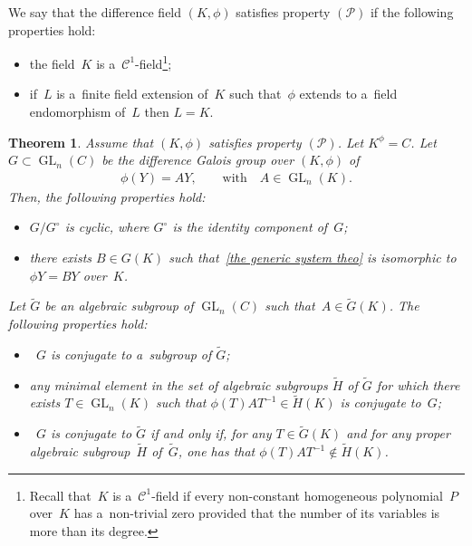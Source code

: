 \documentclass[10pt,a4paper]{amsart}
\numberwithin{equation}{section}
\newtheorem{Theorem}{Theorem}[section]
\begin{document}
\begin{Definition}
\label{prop P}
We say that the dif\/ference f\/ield $(K,\phi)$ satisf\/ies property $(\mathcal{P})$ if the following properties hold:
\begin{itemize}\itemsep=0pt
\item the f\/ield~$K$ is a~$\mathcal{C}^{1}$-f\/ield\footnote{Recall that~$K$ is a~$\mathcal{C}^{1}$-f\/ield if every
non-constant homogeneous polynomial~$P$ over~$K$ has a~non-trivial zero provided that the number of its variables is
more than its degree.};
\item if~$L$ is a~f\/inite f\/ield extension of~$K$ such that~$\phi$ extends to a~f\/ield endomorphism of~$L$ then $L=K$.
\end{itemize}
\end{Definition}

\begin{Theorem}
\label{si prop P alors}
Assume that $(K,\phi)$ satisfies property $(\mathcal{P})$.
Let $K^{\phi} = C$.
Let $G \subset \operatorname{GL}_{n}(C)$ be the difference Galois group over $(K,\phi)$ of
\begin{gather}
\label{the generic system theo}
\phi(Y) = AY, \qquad \text{with} \quad  A \in \operatorname{GL}_{n}(K).
\end{gather}
Then, the following properties hold:
\begin{itemize}
\itemsep=0pt
\item $G/G^{\circ}$ is cyclic, where $G^{\circ}$ is the identity component of~$G$;
\item there exists $B \in G(K)$ such that~\eqref{the generic system theo} is isomorphic to $\phi Y=BY$ over~$K$.
\end{itemize}
Let $\widetilde{G}$ be an algebraic subgroup of $\operatorname{GL}_{n}(C)$ such that~$A\in \widetilde{G}(K)$.
The following properties hold:
\begin{itemize}
\itemsep=0pt
\item~$G$ is conjugate to a~subgroup of $\widetilde{G}$;
\item any minimal element in the set of algebraic subgroups $\widetilde{H}$ of $\widetilde{G}$ for which there exists
$T\in \operatorname{GL}_{n}(K)$ such that $\phi(T)AT^{-1}\in \widetilde{H}(K)$ is conjugate to~$G$;
\item~$G$ is conjugate to $\widetilde{G}$ if and only if, for any $T\in \widetilde{G}(K)$ and for any proper algebraic
sub\-group~$\widetilde{H}$ of~$\widetilde{G}$, one has that $\phi(T)AT^{-1}\notin \widetilde{H}(K)$.
\end{itemize}
\end{Theorem}
\end{document}
